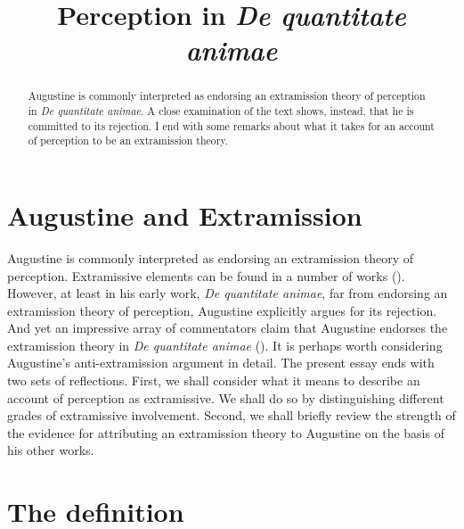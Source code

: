 \documentclass[12pt]{article}
\title{Perception in \emph{De quantitate animae}}
\author{\myauthor}
\date{} %
\begin{document}
\maketitle
\begin{abstract}
	\noindent Augustine is commonly interpreted as endorsing an extramission theory of perception in \emph{De quantitate animae}. A close examination of the text shows, instead, that he is committed to its rejection. I end with some remarks about what it takes for an account of perception to be an extramission theory.
\end{abstract}

\setlength{\parindent}{1em}


\section{Augustine and Extramission} %
\label{sec:augustine_and_extramission}

Augustine is commonly interpreted as endorsing an extramission theory of perception. Extramissive elements can be found in a number of works (). However, at least in his early work, \emph{De quantitate animae}, far from endorsing an extramission theory of perception, Augustine explicitly argues for its rejection. And yet an impressive array of commentators claim that Augustine endorses the extramission theory in \emph{De quantitate animae} (). It is perhaps worth considering Augustine's anti-extramission argument in detail. The present essay ends with two sets of reflections. First, we shall consider what it means to describe an account of perception as extramissive. We shall do so by distinguishing different grades of extramissive involvement. Second, we shall briefly review the strength of the evidence for attributing an extramission theory to Augustine on the basis of his other works.


\section{The definition} %
\label{sec:the_definition}
\end{document}

